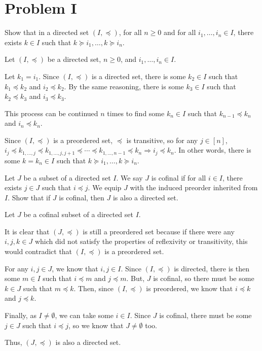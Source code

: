 \documentclass[10pt]{mypackage}
\begin{document}
\RaggedRight
\section{Problem I}%
\begin{problem}[Problem I.1]
  Show that in a directed set $\left( I,\preceq \right)$, for all $n\geq 0$ and for all $i_1,\dots,i_n\in I$, there exists $k\in I$ such that $k\succeq i_1,\dots,k\succeq i_n$.
\end{problem}
\begin{solution}
  Let $\left(I,\preceq\right)$ be a directed set, $n \geq 0$, and $i_1,\ldots,i_n\in I$.

Let $k_1 = i_1$. Since $\left(I,\preceq\right)$ is a directed set, there is some $k_2\in I$ such that $k_1 \preceq k_2$ and $i_2\preceq k_2$. By the same reasoning, there is some $k_3\in I$ such that $k_2\preceq k_3$ and $i_3 \preceq k_3$. 

  This process can be continued $n$ times to find some $k_n\in I$ such that $k_{n-1}\preceq k_n$ and $i_n\preceq k_n$.

  Since $\left(I,\preceq\right)$ is a preordered set, $\preceq$ is transitive, so for any $j\in[n]$, $i_j\preceq k_{1,\ldots,j}\preceq k_{1,\ldots,j,j+1}\preceq\cdots\preceq k_{1,\ldots, n-1}\preceq k_n \Rightarrow i_j\preceq k_n$. In other words, there is some $k=k_n\in I$ such that $k\succeq i_1,\ldots, k\succeq i_n$.
\end{solution}
\begin{problem}[Problem I.2]
  Let $J$ be a subset of a directed set $I$. We say $J$ is cofinal if for all $i\in I$, there exists $j\in J$ such that $i\preceq j$. We equip $J$ with the induced preorder inherited from $I$. Show that if $J$ is cofinal, then $J$ is also a directed set.
\end{problem}
\begin{solution}
  Let $J$ be a cofinal subset of a directed set $I$.

  It is clear that $\left(J,\preceq\right)$ is still a preordered set because if there were any $i,j,k\in J$ which did not satisfy the properties of reflexivity or transitivity, this would contradict that $\left(I,\preceq\right)$ is a preordered set.

  For any $i,j\in J$, we know that $i,j \in I$. Since $\left(I,\preceq\right)$ is directed, there is then some $m\in I$ such that $i \preceq m$ and $j\preceq m$. But, $J$ is cofinal, so there must be some $k \in J$ such that $m \preceq k$. Then, since $\left(I,\preceq\right)$ is preordered, we know that $i\preceq k$ and $j\preceq k$.

Finally, as $I \neq \emptyset$, we can take some $i\in I$. Since $J$ is cofinal, there must be some $j\in J$ such that $i \preceq j$, so we know that $J\neq\emptyset$ too.

Thus, $\left(J,\preceq\right)$ is also a directed set.
\end{solution}
\end{document}
